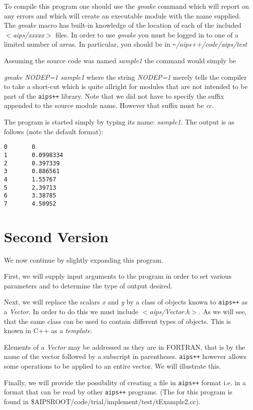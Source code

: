 To compile this program one should use the {\em gmake} command which
will report on any errors and which will create an executable module
with the name supplied.  The {\em gmake} macro has built-in knowledge
of the location of each of the included {\em $<$aips/xxxxx$>$} files. 
In order to use {\em gmake}  you must be logged in to one of
a limited number of areas. In particular, you should be in 
{\em \verb+~+/aips++/code/aips/test}


        Assuming the source code was named {\em sample1}
the command would simply be 

{\em gmake NODEP=1 sample1} where the string {\em NODEP=1} merely tells the
compiler to take a short-cut which is quite allright for modules that are not
intended to be part of the {\tt aips++} library.
Note that we did not have to specify the suffix appended to the source
module name. However that suffix must be {\em cc}.

The program is started simply by typing its name: {\em sample1}.  
The output is as follows (note the default format):
\begin{verbatim}
0       0
1       0.0998334
2       0.397339
3       0.886561
4       1.55767
5       2.39713
6       3.38785
7       4.50952
\end{verbatim}
 
\newpage


\section{Second Version}

        We now continue by slightly expanding this program.

First, we will supply input arguments to the program in order to set
various parameters and to determine the type of output desired.

Next, we will replace the scalars {\em x} and {\em y} by a 
class of objects known to {\tt aips++} as a {\em Vector}.  In order to do
this we must include {\em $<$aips/Vector.h$>$}.
As we will see, that the same class can be used to contain different
types of objects. This is known in C++ as a {\em template}.

Elements of a {\em Vector} may be addressed as they are in FORTRAN, that is
by the name of the vector followed by a subscript in parentheses.  {\tt aips++}
however allows some operations to be applied to an entire vector. We will
illustrate this.

Finally, we will provide the possibility of creating
a file in {\tt aips++} format i.e. in a format that can be read by other
{\tt aips++} programs. 
(The 
for this program is found in 
\$AIPSROOT/code/trial/implement/test/tExample2.cc). 

